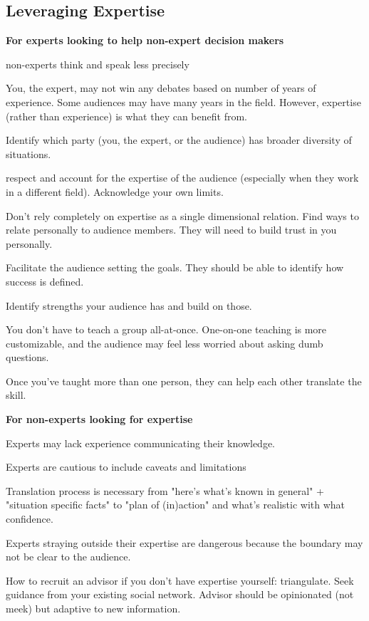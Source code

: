 \subsection{Leveraging Expertise}

\textbf{For experts looking to help non-expert decision makers}

non-experts think and speak less precisely

You, the expert, may not win any debates based on number of years of experience. Some audiences may have many years in the field. However, expertise (rather than experience) is what they can benefit from. 

Identify which party (you, the expert, or the audience) has broader diversity of situations.

respect and account for the expertise of the audience (especially when they work in a different field). Acknowledge your own limits.

Don't rely completely on expertise as a single dimensional relation. Find ways to relate personally to audience members. They will need to build trust in you personally.

Facilitate the audience setting the goals. They should be able to identify how success is defined.

Identify strengths your audience has and build on those.

You don't have to teach a group all-at-once. One-on-one teaching is more customizable, and the audience may feel less worried about asking dumb questions.

Once you've taught more than one person, they can help each other translate the skill. 

\textbf{For non-experts looking for expertise}

Experts may lack experience communicating their knowledge. 

Experts are cautious to include caveats and limitations

Translation process is necessary from "here's what's known in general" + "situation specific facts" to "plan of (in)action" and what's realistic with what confidence. 

Experts straying outside their expertise are dangerous because the boundary may not be clear to the audience.



How to recruit an advisor if you don't have expertise yourself: triangulate. Seek guidance from your existing social network. Advisor should be opinionated (not meek) but adaptive to new information. 